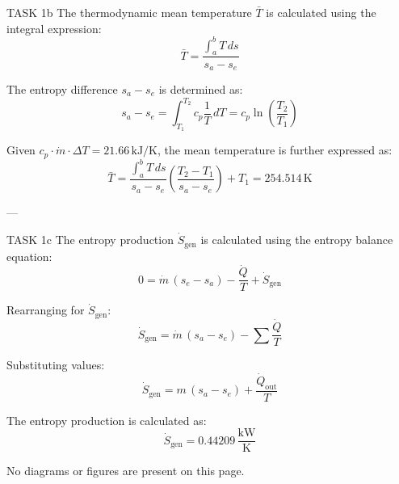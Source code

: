TASK 1b  
The thermodynamic mean temperature \( \bar{T} \) is calculated using the integral expression:  
\[
\bar{T} = \frac{\int_a^b T \, ds}{s_a - s_e}
\]  

The entropy difference \( s_a - s_e \) is determined as:  
\[
s_a - s_e = \int_{T_1}^{T_2} c_{p} \frac{1}{T} \, dT = c_{p} \ln \left( \frac{T_2}{T_1} \right)
\]  

Given \( c_{p} \cdot \dot{m} \cdot \Delta T = 21.66 \, \text{kJ/K} \), the mean temperature is further expressed as:  
\[
\bar{T} = \frac{\int_a^b T \, ds}{s_a - s_e} \left( \frac{T_2 - T_1}{s_a - s_e} \right) + T_1 = 254.514 \, \text{K}
\]  

---

TASK 1c  
The entropy production \( \dot{S}_{\text{gen}} \) is calculated using the entropy balance equation:  
\[
0 = \dot{m} \, (s_e - s_a) - \frac{\dot{Q}}{T} + \dot{S}_{\text{gen}}
\]  

Rearranging for \( \dot{S}_{\text{gen}} \):  
\[
\dot{S}_{\text{gen}} = \dot{m} \, (s_a - s_e) - \sum \frac{\dot{Q}}{T}
\]  

Substituting values:  
\[
\dot{S}_{\text{gen}} = m \, (s_a - s_e) + \frac{\dot{Q}_{\text{out}}}{T}
\]  

The entropy production is calculated as:  
\[
\dot{S}_{\text{gen}} = 0.44209 \, \frac{\text{kW}}{\text{K}}
\]  

No diagrams or figures are present on this page.